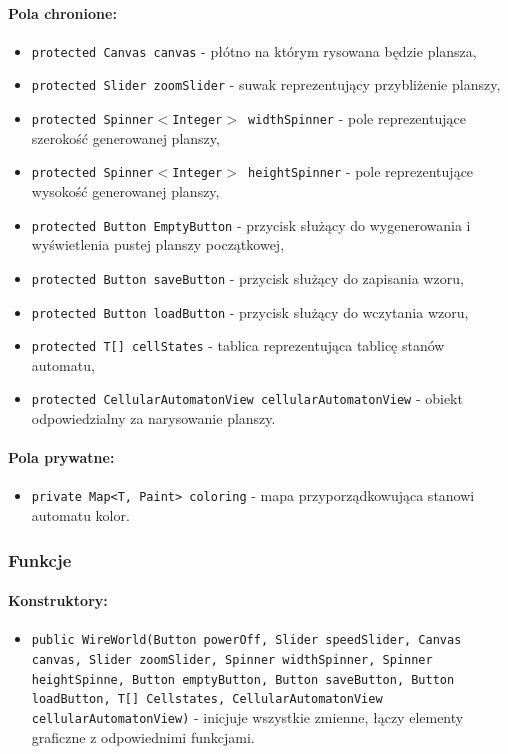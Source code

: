 \documentclass{report}
\begin{document}
\paragraph{Pola chronione:}
\begin{itemize}
	\item \texttt{protected Canvas canvas} - płótno na którym rysowana będzie plansza,
	\item \texttt{protected Slider zoomSlider} - suwak reprezentujący przybliżenie planszy,
	\item \texttt{protected Spinner$<$Integer$>$  widthSpinner} - pole reprezentujące szerokość generowanej planszy,
	\item \texttt{protected Spinner$<$Integer$>$ heightSpinner} - pole reprezentujące wysokość generowanej planszy,
	\item \texttt{protected Button EmptyButton} - przycisk służący do wygenerowania i wyświetlenia pustej planszy początkowej,
	\item \texttt{protected Button saveButton} - przycisk służący do zapisania wzoru,
	\item \texttt{protected Button loadButton} - przycisk służący do wczytania wzoru,
	\item \texttt{protected T[] cellStates} - tablica reprezentująca tablicę stanów automatu,
	\item \texttt{protected CellularAutomatonView cellularAutomatonView} - obiekt odpowiedzialny za narysowanie planszy.
\end{itemize}

\paragraph{Pola prywatne:}
\begin{itemize}
	\item \texttt{private Map<T, Paint> coloring} - mapa przyporządkowująca stanowi automatu kolor.
\end{itemize}
\subsubsection{Funkcje}
\paragraph{Konstruktory:}
\begin{itemize}
\item \texttt{public WireWorld(Button powerOff, Slider speedSlider, Canvas canvas, Slider zoomSlider, Spinner widthSpinner, Spinner heightSpinne, Button emptyButton, Button saveButton, Button loadButton, T[] Cellstates, CellularAutomatonView cellularAutomatonView)} - inicjuje wszystkie zmienne, łączy elementy graficzne z odpowiednimi funkcjami.
\end{itemize}
\end{document}
